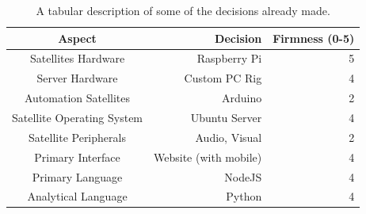 		\begin{table}[h]
			\centering
			\begin{tabular}{c|r|r}
				\toprule
					Aspect & Decision & Firmness (0-5) \\
				\midrule
					Satellites Hardware & Raspberry Pi & 5 \\
					Server Hardware & Custom PC Rig & 4 \\
					Automation Satellites & Arduino & 2 \\
					Satellite Operating System & Ubuntu Server & 4 \\
					Satellite Peripherals & Audio, Visual & 2 \\
					Primary Interface & Website (with mobile) & 4 \\
					Primary Language & NodeJS & 4 \\
					Analytical Language & Python & 4 \\
					\bottomrule
			\end{tabular}
			\label{decision-matrix}
			\caption{A tabular description of some of the decisions already made.}
		\end{table}
